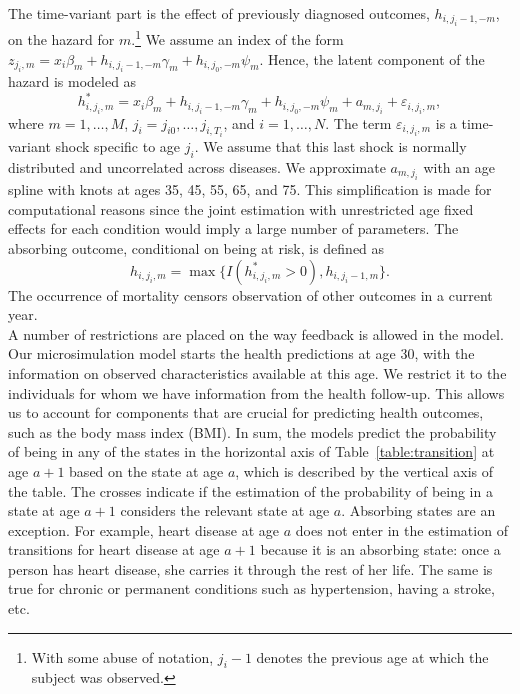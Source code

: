 \noindent The time-variant part is the effect of previously diagnosed outcomes, $h_{i,j_i-1,-m}$,
on the hazard for $m$.\footnote{With some abuse of notation, $j_i-1$ denotes
the previous age at which the subject was observed.} We assume an index of
the form $z_{j_i,m} = x_i\beta_m + h_{i,j_i-1,-m} \gamma_m + h_{i,j_0,-m}\psi_m$. Hence, the
latent component of the hazard is modeled as
\begin{equation}
h^*_{i,j_i,m}= x_i\beta_m + h_{i,j_i-1,-m} \gamma_m + h_{i,j_0,-m}\psi_m + a_{m,j_i} + \varepsilon_{i,j_i,m},
\label{eqn:transition_hzd_latent}
\end{equation}
where $m = 1,\ldots,M$, $j_i = j_{i0},\ldots,j_{i,T_i}$, and $i=1,\ldots,N$.
The term $\varepsilon_{i,j_i,m}$ is a time-variant shock specific to age $j_i$.
We assume that this last shock is normally distributed and uncorrelated across
diseases. We approximate $a_{m,j_i}$ with an age spline with knots at ages 35, 45,
55, 65, and 75.
This simplification is made
for computational reasons since the joint estimation with unrestricted age fixed
effects for each condition would imply a large number of parameters. The
absorbing outcome, conditional on being at risk, is defined as
\begin{equation*}
h_{i,j_i,m} = \max\{I(h^*_{i,j_i,m} > 0), h_{i,j_i-1,m}\}.
\end{equation*}
The occurrence of mortality censors observation of other
outcomes in a current year. \\

\noindent A number of restrictions are placed on the way feedback is allowed in the model. Our microsimulation model starts the health predictions at age 30, with the information on observed characteristics available at this age. We restrict it to the individuals for whom we have information from the health follow-up. This allows us to account for components that are crucial for predicting health outcomes, such as the body mass index (BMI). In sum, the models predict the probability of being in any of the states in the horizontal axis of Table~\ref{table:transition} at age $a+1$ based on the state at age $a$, which is described by the vertical axis of the table. The crosses indicate if the estimation of the probability of being in a state at age $a+1$ considers the relevant state at age $a$. Absorbing states are an exception. For example, heart disease at age $a$ does not enter in the estimation of transitions for heart disease at age $a+1$ because it is an absorbing state: once a person has heart disease, she carries it through the rest of her life. The same is true for chronic or permanent conditions such as hypertension, having a stroke, etc. \\

